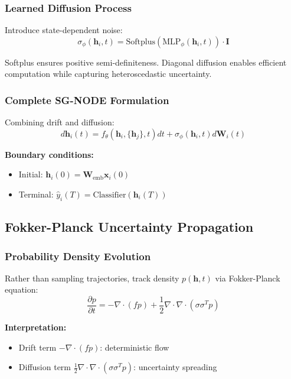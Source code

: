 \documentclass{article}
\begin{document}
\subsubsection{Learned Diffusion Process}

Introduce state-dependent noise:
\begin{equation}
\sigma_\phi(\mathbf{h}_i, t) = \text{Softplus}(\text{MLP}_\phi(\mathbf{h}_i, t)) \cdot \mathbf{I}
\end{equation}

Softplus ensures positive semi-definiteness. Diagonal diffusion enables efficient computation while capturing heteroscedastic uncertainty.

\subsubsection{Complete SG-NODE Formulation}

Combining drift and diffusion:
\begin{equation}
d\mathbf{h}_i(t) = f_\theta(\mathbf{h}_i, \{\mathbf{h}_j\}, t) dt + \sigma_\phi(\mathbf{h}_i, t) d\mathbf{W}_i(t)
\end{equation}

\textbf{Boundary conditions:}
\begin{itemize}
\item Initial: $\mathbf{h}_i(0) = \mathbf{W}_{\text{emb}} \mathbf{x}_i(0)$
\item Terminal: $\hat{y}_i(T) = \text{Classifier}(\mathbf{h}_i(T))$
\end{itemize}

\subsection{Fokker-Planck Uncertainty Propagation}

\subsubsection{Probability Density Evolution}

Rather than sampling trajectories, track density $p(\mathbf{h}, t)$ via Fokker-Planck equation:
\begin{equation}
\frac{\partial p}{\partial t} = -\nabla \cdot (f p) + \frac{1}{2}\nabla \cdot \nabla \cdot (\sigma \sigma^T p)
\end{equation}

\textbf{Interpretation:}
\begin{itemize}
\item Drift term $-\nabla \cdot (f p)$: deterministic flow
\item Diffusion term $\frac{1}{2}\nabla \cdot \nabla \cdot (\sigma \sigma^T p)$: uncertainty spreading
\end{itemize}
\end{document}
